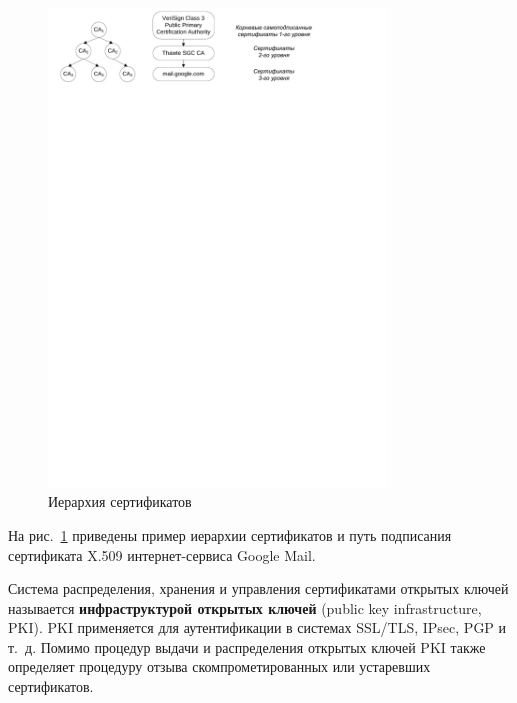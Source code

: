 \begin{figure}[!ht]
	\centering
	\includegraphics[width=0.8\textwidth]{pic/X509-hierarchy}
	\caption{Иерархия сертификатов\label{fig:x509-hierarchy}}
\end{figure}

На рис.~\ref{fig:x509-hierarchy} приведены пример иерархии сертификатов и путь подписания сертификата X.509 интернет-сервиса Google Mail.

Система распределения, хранения и управления сертификатами открытых ключей называется \textbf{инфраструктурой открытых ключей} (public key infrastructure, PKI). PKI применяется для аутентификации в системах SSL/TLS, IPsec, PGP и т.~д. Помимо процедур выдачи и распределения открытых ключей PKI также определяет процедуру отзыва скомпрометированных или устаревших сертификатов.
